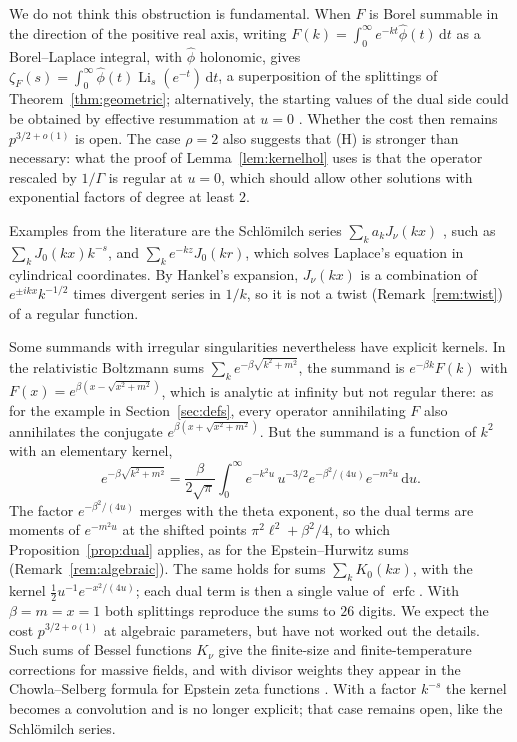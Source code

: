 \documentclass[11pt,reqno]{amsart}
\theoremstyle{definition}
\theoremstyle{remark}
\newcommand{\erfc}{\operatorname{erfc}}
\newcommand{\Li}{\operatorname{Li}}
\newcommand{\dd}{\,\mathrm{d}}
\begin{document}
We do not think this obstruction is fundamental. When $F$ is Borel summable in the direction of the positive real
axis, writing $F(k) = \int_0^\infty e^{-kt}\hat\phi(t)\dd t$ as a Borel--Laplace integral, with $\hat\phi$ holonomic,
gives
$\zeta_F(s) = \int_0^\infty\hat\phi(t)\Li_s(e^{-t})\dd t$, a superposition of the splittings of
Theorem~\ref{thm:geometric}; alternatively, the starting values of the dual side could be obtained by effective
resummation at $u = 0$ \cite{vdH07}. Whether the cost then remains $p^{3/2+o(1)}$ is open. The case $\rho = 2$ also
suggests that (H) is stronger than necessary: what the proof of Lemma~\ref{lem:kernelhol} uses is that the operator
rescaled by $1/\Gamma$ is regular at $u = 0$, which should allow other solutions with exponential factors of degree at
least $2$.

Examples from the literature are the Schl\"omilch series $\sum_ka_kJ_\nu(kx)$ \cite{Wat44}, such as
$\sum_kJ_0(kx)k^{-s}$, and $\sum_ke^{-kz}J_0(kr)$, which solves Laplace's equation in cylindrical coordinates. By Hankel's expansion,
$J_\nu(kx)$ is a combination of $e^{\pm ikx}k^{-1/2}$ times divergent series in $1/k$, so it is not a twist
(Remark~\ref{rem:twist}) of a regular function.

Some summands with irregular singularities nevertheless have explicit kernels. In the relativistic Boltzmann sums
$\sum_ke^{-\beta\sqrt{k^2+m^2}}$, the summand is $e^{-\beta k}F(k)$ with $F(x) = e^{\beta(x-\sqrt{x^2+m^2})}$, which is
analytic at infinity but not regular there: as for the example in Section~\ref{sec:defs}, every operator annihilating
$F$ also annihilates the conjugate $e^{\beta(x+\sqrt{x^2+m^2})}$. But the summand is a function of $k^2$ with an
elementary kernel,
\[
  e^{-\beta\sqrt{k^2+m^2}} = \frac{\beta}{2\sqrt\pi}\int_0^\infty e^{-k^2u}\,u^{-3/2}e^{-\beta^2/(4u)}e^{-m^2u}\dd u.
\]
The factor $e^{-\beta^2/(4u)}$ merges with the theta exponent, so the dual terms are moments of $e^{-m^2u}$ at the
shifted points $\pi^2\ell^2 + \beta^2/4$, to which Proposition~\ref{prop:dual} applies, as for the Epstein--Hurwitz sums
(Remark~\ref{rem:algebraic}). The same holds for sums $\sum_kK_0(kx)$, with the kernel $\frac12u^{-1}e^{-x^2/(4u)}$;
each dual term is then a single value of $\erfc$. With $\beta = m = x = 1$ both splittings reproduce the sums to
$26$ digits. We expect the cost $p^{3/2+o(1)}$ at algebraic parameters, but have not worked out the details. Such sums
of Bessel functions $K_\nu$ give the finite-size and finite-temperature corrections for massive fields, and with
divisor weights they appear in the Chowla--Selberg formula for Epstein zeta functions \cite{Eli95,Kir02}. With a
factor $k^{-s}$ the kernel becomes a convolution and is no longer explicit; that case remains open, like the
Schl\"omilch series.
\end{document}
